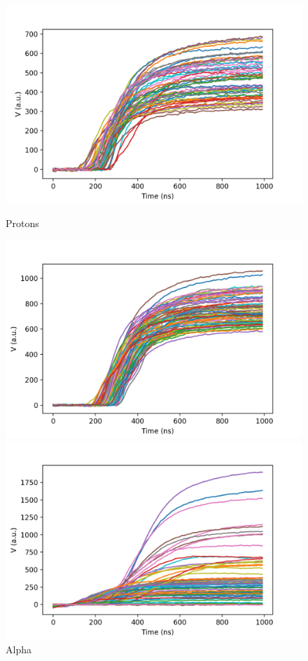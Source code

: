 \begin{figure}[htb]
  \centering
  \begin{minipage}[b]{0.45\textwidth}
    \includegraphics[width=\textwidth]{img/protons.png}
    \caption{Protons}
  \end{minipage}
  \hfill
  \begin{minipage}[b]{0.45\textwidth}
   \includegraphics[width=\textwidth]{img/alpha.png}
  \caption{Alpha}
  \end{minipage}
  \hfill
  \begin{minipage}[b]{0.45\textwidth}
   \includegraphics[width=\textwidth]{img/other.png}

\end{minipage}
\end{figure}
